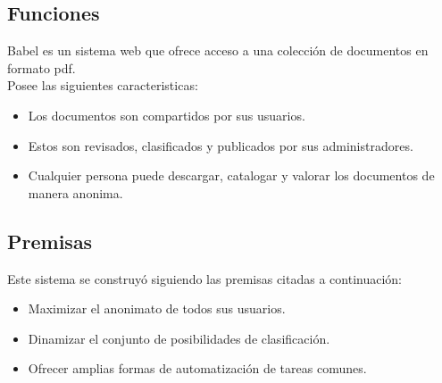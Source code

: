 \documentclass[11pt]{beamer}
\begin{document}
\subsection{Funciones}
\begin{frame}
Babel es un sistema web que ofrece acceso a una colección de documentos en formato pdf.\\ \pause
Posee las siguientes caracteristicas: \pause
\begin{itemize}
\item Los documentos son compartidos por sus usuarios. \pause
\item Estos son revisados, clasificados y publicados por sus administradores. \pause
\item Cualquier persona puede descargar, catalogar y valorar los documentos de manera anonima.
\end{itemize}
\end{frame}

\subsection{Premisas}
\begin{frame}
Este sistema se construyó siguiendo las premisas citadas a continuación:\\ \pause
\begin{itemize}
\item Maximizar el anonimato de todos sus usuarios. \pause
\item Dinamizar el conjunto de posibilidades de clasificación. \pause
\item Ofrecer amplias formas de automatización de tareas comunes.
\end{itemize}
\end{frame}
\end{document}
